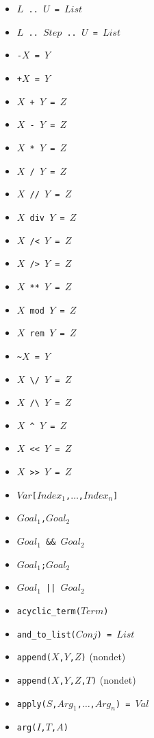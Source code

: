 \documentclass[10pt]{article}
\begin{document}
\begin{multicols}{2}
\begin{scriptsize}
\begin{itemize}
    \item {\tt $L$ \verb+..+ $U$ = $List$} 
    \item {\tt $L$ \verb+..+ $Step$ \verb+..+ $U$ = $List$} 
    \item {\tt \verb+-+$X$ = $Y$}
    \item {\tt \verb-+-$X$ = $Y$}
    \item {\tt $X$ \verb-+- $Y$ = $Z$} 
    \item {\tt $X$ \verb+-+ $Y$ = $Z$} 
    \item {\tt $X$ \verb+*+ $Y$ = $Z$} 
    \item {\tt $X$ \verb+/+ $Y$ = $Z$} 
    \item {\tt $X$ \verb+//+ $Y$ = $Z$} 
    \item \texttt{$X$ div $Y$ = $Z$} 
    \item {\tt $X$ \verb+/<+ $Y$ = $Z$} 
    \item {\tt $X$ \verb+/>+ $Y$ = $Z$} 
    \item {\tt $X$ \verb+**+ $Y$ = $Z$} 
    \item \texttt{$X$ mod $Y$ = $Z$} 
    \item \texttt{$X$ rem $Y$ = $Z$} 
    \item {\tt \verb+~+$X$ = $Y$} 
    \item {\tt $X$ \verb+\/+ $Y$ = $Z$} 
    \item {\tt $X$ \verb+/\+ $Y$ = $Z$} 
    \item {\tt $X$ \verb+^+ $Y$ = $Z$} 
    \item {\tt $X$ \verb+<<+ $Y$ = $Z$} 
    \item {\tt $X$ \verb+>>+ $Y$ = $Z$} 
    \item {\tt $Var$\verb+[+$Index_1$,$\ldots$,$Index_n$\verb+]+}
    \item \texttt{$Goal_1$,$Goal_2$}
    \item \texttt{$Goal_1$ \&\& $Goal_2$}
    \item \texttt{$Goal_1$;$Goal_2$}
    \item \texttt{$Goal_1$ || $Goal_2$}
    \item \texttt{acyclic\_term($Term$)}
    \item \texttt{and\_to\_list($Conj$) = $List$}
    \item \texttt{append($X$,$Y$,$Z$)}  (nondet)
    \item \texttt{append($X$,$Y$,$Z$,$T$)}  (nondet)
    \item \texttt{apply($S$,$Arg_1$,$\ldots$,$Arg_n$) = $Val$}
    \item \texttt{arg($I$,$T$,$A$)}    

\end{itemize}
\end{scriptsize}
\end{multicols}
\end{document}
